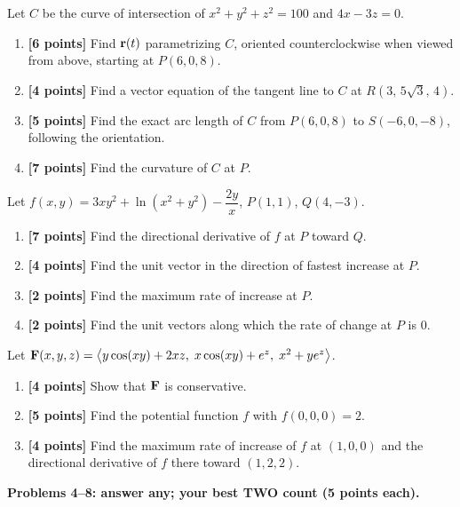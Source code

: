 \begin{questions}
\item Let $C$ be the curve of intersection of $x^2+y^2+z^2=100$ and $4x-3z=0$.
      \begin{enumerate}[label=(\alph*)]
        \item \textbf{[6 points]} Find $\mathbf{r}(t)$ parametrizing $C$, oriented counterclockwise
              when viewed from above, starting at $P(6,0,8)$.
        \item \textbf{[4 points]} Find a vector equation of the tangent line to $C$ at
              $R\left(3,\,5\sqrt3,\,4\right)$.
        \item \textbf{[5 points]} Find the exact arc length of $C$ from $P(6,0,8)$ to
              $S(-6,0,-8)$, following the orientation.
        \item \textbf{[7 points]} Find the curvature of $C$ at $P$.
      \end{enumerate}\label{pq:1}
\item Let $f(x,y)=3xy^2+\ln(x^2+y^2)-\dfrac{2y}{x}$, $P(1,1)$, $Q(4,-3)$.
      \begin{enumerate}[label=(\alph*)]
        \item \textbf{[7 points]} Find the directional derivative of $f$ at $P$ toward $Q$.
        \item \textbf{[4 points]} Find the unit vector in the direction of fastest increase at $P$.
        \item \textbf{[2 points]} Find the maximum rate of increase at $P$.
        \item \textbf{[2 points]} Find the unit vectors along which the rate of change at $P$ is $0$.
      \end{enumerate}\label{pq:2}
\item Let $\mathbf{F}(x,y,z)=\left\langle y\cos(xy)+2xz,\;x\cos(xy)+e^z,\;x^2+ye^z \right\rangle$.
      \begin{enumerate}[label=(\alph*)]
        \item \textbf{[4 points]} Show that $\mathbf{F}$ is conservative.
        \item \textbf{[5 points]} Find the potential function $f$ with $f(0,0,0)=2$.
        \item \textbf{[4 points]} Find the maximum rate of increase of $f$ at $(1,0,0)$ and
              the directional derivative of $f$ there toward $(1,2,2)$.
      \end{enumerate}\label{pq:3}
\end{questions}

\textbf{Problems 4--8: answer any; your best TWO count (5 points each).}

